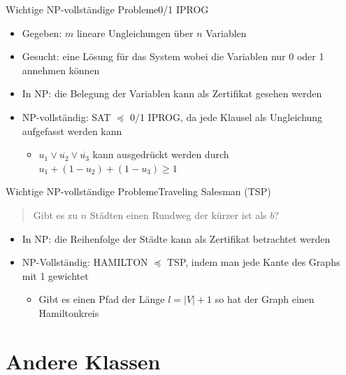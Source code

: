 \documentclass[ignorenonframetext,]{beamer}
\begin{document}
\begin{frame}{Wichtige NP-vollständige Probleme}{0/1 IPROG}

\begin{itemize}
\itemsep1pt\parskip0pt
\item
  Gegeben: $m$ lineare Ungleichungen über $n$ Variablen
\item
  Gesucht: eine Lösung für das System wobei die Variablen nur 0 oder 1
  annehmen können
\item
  In NP: die Belegung der Variablen kann als Zertifikat gesehen werden
\item
  NP-vollständig: SAT $\preceq$ 0/1 IPROG, da jede Klausel als
  Ungleichung aufgefasst werden kann

  \begin{itemize}
  \itemsep1pt\parskip0pt
  \item
    $u_1 \vee \overline{u_2} \vee \overline{u_3}$ kann ausgedrückt
    werden durch $u_1 + (1 - u_2) + (1 - u_3) \geq 1$
  \end{itemize}
\end{itemize}

\end{frame}

\begin{frame}{Wichtige NP-vollständige Probleme}{Traveling Salesman (TSP)}

\begin{quote}
Gibt es zu $n$ Städten einen Rundweg der kürzer ist als $b$?
\end{quote}

\begin{itemize}
\itemsep1pt\parskip0pt
\item
  In NP: die Reihenfolge der Städte kann als Zertifikat betrachtet
  werden
\item
  NP-Vollständig: HAMILTON $\preceq$ TSP, indem man jede Kante des
  Graphs mit 1 gewichtet

  \begin{itemize}
  \itemsep1pt\parskip0pt
  \item
    Gibt es einen Pfad der Länge $l = |V|+1$ so hat der Graph einen
    Hamiltonkreis
  \end{itemize}
\end{itemize}

\end{frame}

\section{Andere Klassen}\label{andere-klassen}
\end{document}
